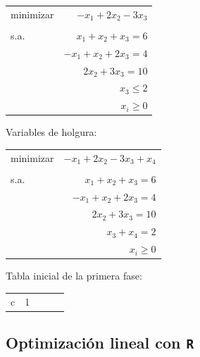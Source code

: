 \begin{example}

\begin{center}
\begin{tabular}{lr}
minimizar & $-x_1 + 2x_2 -3x_3$ \\
	 &  \\
s.a. & $x_1+x_2+x_3 =6 $    \\
	 & $-x_1 + x_2 + 2x_3  = 4$  \\
	 & $2x_2 + 3x_3  = 10$  \\
	 & $x_3  \leq 2$  \\
	 & $x_i\geq 0$
\end{tabular}
\end{center}

Variables de holgura:
\begin{center}
\begin{tabular}{lr}
minimizar & $-x_1 + 2x_2 -3x_3 + x_4$ \\
	 &  \\
s.a. & $x_1+x_2+x_3 =6 $    \\
	 & $-x_1 + x_2 + 2x_3  = 4$  \\
	 & $2x_2 + 3x_3  = 10$  \\
	 & $x_3 + x_4  = 2$  \\
	 & $x_i\geq 0$
\end{tabular}
\end{center}


Tabla inicial de la primera fase:

\begin{tabular}{ccccc}
c&1
\end{tabular}


\end{example}

\subsection{Optimización lineal con {\tt R}}

